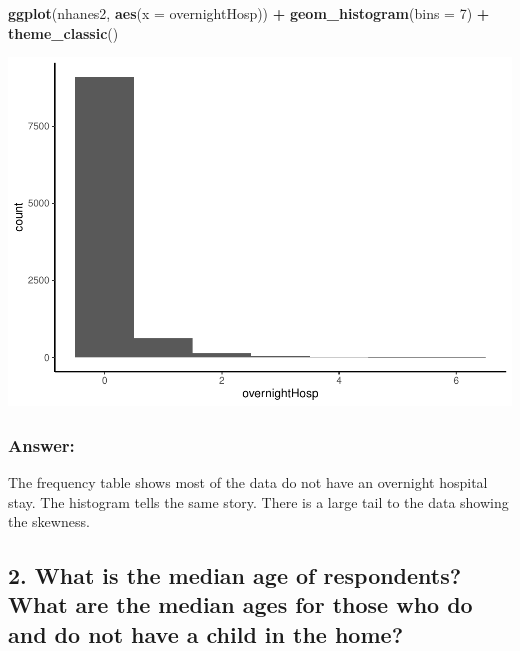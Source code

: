 \documentclass[]{article}
\newenvironment{Shaded}{\begin{snugshade}}{\end{snugshade}}
\newcommand{\DataTypeTok}[1]{\textcolor[rgb]{0.13,0.29,0.53}{#1}}
\newcommand{\DecValTok}[1]{\textcolor[rgb]{0.00,0.00,0.81}{#1}}
\newcommand{\KeywordTok}[1]{\textcolor[rgb]{0.13,0.29,0.53}{\textbf{#1}}}
\newcommand{\NormalTok}[1]{#1}
\newcommand{\OperatorTok}[1]{\textcolor[rgb]{0.81,0.36,0.00}{\textbf{#1}}}
\newcommand{\StringTok}[1]{\textcolor[rgb]{0.31,0.60,0.02}{#1}}
\begin{document}
\begin{Shaded}
\begin{Highlighting}[]
\KeywordTok{ggplot}\NormalTok{(nhanes2, }\KeywordTok{aes}\NormalTok{(}\DataTypeTok{x =}\NormalTok{ overnightHosp)) }\OperatorTok{+}
\StringTok{  }\KeywordTok{geom_histogram}\NormalTok{(}\DataTypeTok{bins =} \DecValTok{7}\NormalTok{) }\OperatorTok{+}
\StringTok{  }\KeywordTok{theme_classic}\NormalTok{()}
\end{Highlighting}
\end{Shaded}

\includegraphics{assignment2_files/figure-latex/q1_hist-1.pdf}

\hypertarget{answer}{%
\subsubsection{Answer:}\label{answer}}

The frequency table shows most of the data do not have an overnight
hospital stay. The histogram tells the same story. There is a large tail
to the data showing the skewness.

\hypertarget{what-is-the-median-age-of-respondents-what-are-the-median-ages-for-those-who-do-and-do-not-have-a-child-in-the-home}{%
\subsection{2. What is the median age of respondents? What are the
median ages for those who do and do not have a child in the
home?}\label{what-is-the-median-age-of-respondents-what-are-the-median-ages-for-those-who-do-and-do-not-have-a-child-in-the-home}}
\end{document}
